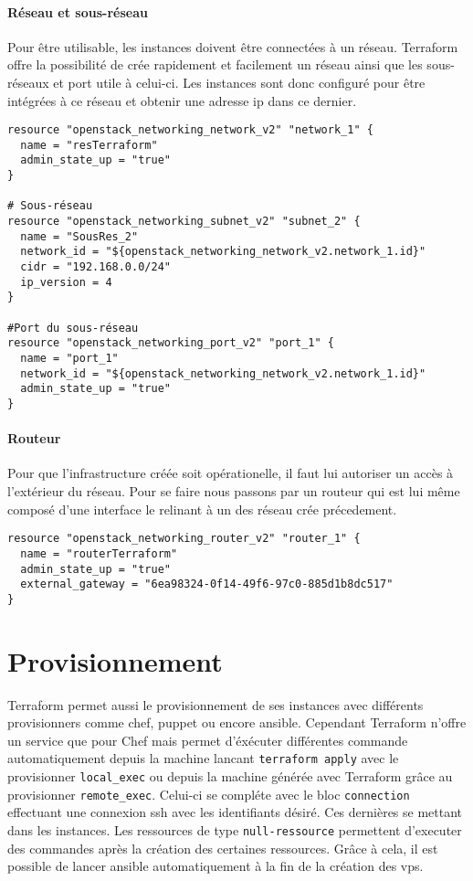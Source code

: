 \documentclass[]{article}
\let\oldparagraph\paragraph
\renewcommand{\paragraph}[1]{\oldparagraph{#1}\mbox{}}
\begin{document}
\paragraph{Réseau et sous-réseau}\label{ruxe9seau-et-sous-ruxe9seau}

Pour être utilisable, les instances doivent être connectées à un réseau.
Terraform offre la possibilité de crée rapidement et facilement un
réseau ainsi que les sous-réseaux et port utile à celui-ci. Les
instances sont donc configuré pour être intégrées à ce réseau et obtenir
une adresse ip dans ce dernier.

\begin{verbatim}
resource "openstack_networking_network_v2" "network_1" {
  name = "resTerraform"
  admin_state_up = "true"
}

# Sous-réseau
resource "openstack_networking_subnet_v2" "subnet_2" {
  name = "SousRes_2"
  network_id = "${openstack_networking_network_v2.network_1.id}"
  cidr = "192.168.0.0/24"
  ip_version = 4 
}

#Port du sous-réseau
resource "openstack_networking_port_v2" "port_1" {
  name = "port_1"
  network_id = "${openstack_networking_network_v2.network_1.id}"
  admin_state_up = "true"
}
\end{verbatim}

\paragraph{Routeur}\label{routeur}

Pour que l'infrastructure créée soit opérationelle, il faut lui
autoriser un accès à l'extérieur du réseau. Pour se faire nous passons
par un routeur qui est lui même composé d'une interface le relinant à un
des réseau crée précedement.

\begin{verbatim}
resource "openstack_networking_router_v2" "router_1" {
  name = "routerTerraform"
  admin_state_up = "true"
  external_gateway = "6ea98324-0f14-49f6-97c0-885d1b8dc517"
}
\end{verbatim}

\section{Provisionnement}\label{provisionnement}

Terraform permet aussi le provisionnement de ses instances avec
différents provisionners comme chef, puppet ou encore ansible. Cependant
Terraform n'offre un service que pour Chef mais permet d'éxécuter
différentes commande automatiquement depuis la machine lancant
\texttt{terraform\ apply} avec le provisionner \texttt{local\_exec} ou
depuis la machine générée avec Terraform grâce au provisionner
\texttt{remote\_exec}. Celui-ci se compléte avec le bloc
\texttt{connection} effectuant une connexion ssh avec les identifiants
désiré. Ces dernières se mettant dans les instances. Les ressources de
type \texttt{null-ressource} permettent d'executer des commandes après
la création des certaines ressources. Grâce à cela, il est possible de
lancer ansible automatiquement à la fin de la création des vps.
\end{document}
